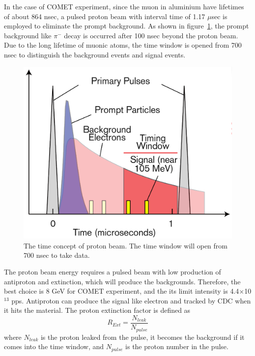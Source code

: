 In the case of COMET experiment, since the muon in aluminium have lifetimes of about 864 nsec, a pulsed proton beam with interval time of 1.17 $\mu$sec is employed to eliminate the prompt background.
As shown in figure~\ref{time}, the prompt background like $\pi^-$ decay is occurred after 100 nsec beyond the proton beam.
Due to the long lifetime of muonic atoms, the time window is opened from 700 nsec to distinguish the background events and signal events.
\begin{figure}[H]
 \centering
 \includegraphics[scale=0.35]{chapter1/fig/time.pdf}
 \caption{The time concept of proton beam. The time window will open from 700 nsec to take data.}
 \label{time}
\end{figure}
The proton beam energy requires a pulsed beam with low production of antiproton and extinction, which will produce the backgrounds.
Therefore, the best choice is 8 GeV for COMET experiment, and the its limit intensity is 4.4$\times$10$^{13}$ pps.
Antiproton can produce the signal like electron and tracked by CDC when it hits the material.
The proton extinction factor is defined as
\begin{equation}
 R_{Ext} = \frac{N_{leak}}{N_{pulse}}
\end{equation}
where $N_{leak}$ is the proton leaked from the pulse, it becomes the background if it comes into the time window, and $N_{pulse}$ is the proton number in the pulse.


